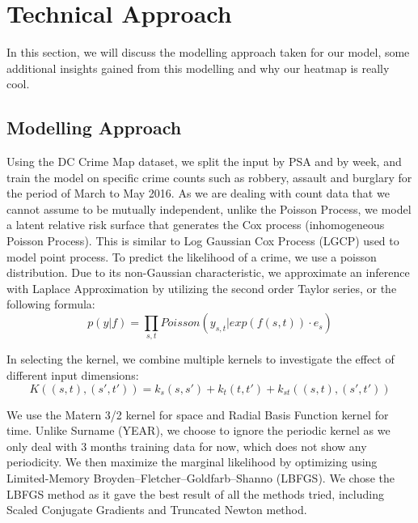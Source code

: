 \documentclass[a4paper, 10pt, conference]{ieeeconf}
\begin{document}
	\section{Technical Approach}
	
	In this section, we will discuss the modelling approach taken for our model, some additional insights gained from this modelling and why our heatmap is really cool.
	
	\subsection{Modelling Approach}
	Using the DC Crime Map dataset, we split the input by PSA and by week, and train the model on specific crime counts such as robbery, assault and burglary for the period of March to May 2016. 
	As we are dealing with count data that we cannot assume to be mutually independent, unlike the Poisson Process, we model a latent relative risk surface that generates the Cox process (inhomogeneous Poisson Process).
	This is similar to Log Gaussian Cox Process (LGCP) used to model point process.
	To predict the likelihood of a crime, we use a poisson distribution. Due to its non-Gaussian characteristic, we approximate an inference with Laplace Approximation by utilizing the second order Taylor series, or the following formula:
	\[p(y|f) = \prod_{s,t}Poisson(y_{s,t}|exp(f(s,t))\cdot e_s)\]

	In selecting the kernel, we combine multiple kernels to investigate the effect of different input dimensions:
	\[K((s,t),(s',t')) = k_s(s,s')+k_t(t,t')+k_{st}((s,t),(s',t'))\]

	We use the Matern 3/2 kernel for space and Radial Basis Function kernel for time.
	Unlike Surname (YEAR), we choose to ignore the periodic kernel as we only deal with 3 months training data for now, which does not show any periodicity.
	We then maximize the marginal likelihood by optimizing using Limited-Memory Broyden–Fletcher–Goldfarb–Shanno (LBFGS).
	We chose the LBFGS method as it gave the best result of all the methods tried, including Scaled Conjugate Gradients and Truncated Newton method.
	
\end{document}
